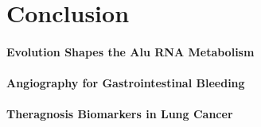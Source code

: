 
\chapter{Conclusion}

\subsubsection{Evolution Shapes the Alu RNA Metabolism}
\label{subsubsec:alus}

\subsubsection{Angiography for Gastrointestinal Bleeding}
\label{subsubsec:angio}

\subsubsection{Theragnosis Biomarkers in Lung Cancer}
\label{subsubsec:alk}




